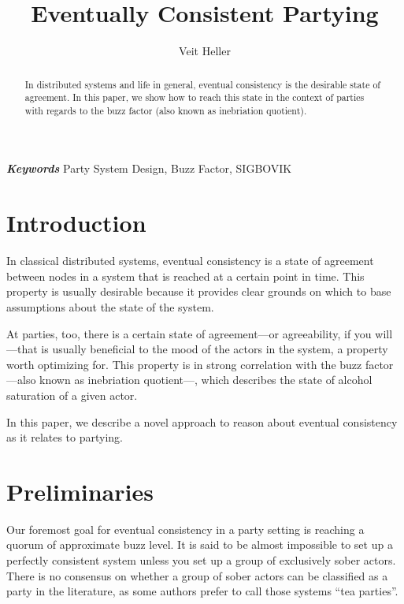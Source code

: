 \documentclass[twocolumn]{article}
\providecommand{\keywords}[1]{\noindent \textbf{\textit{Keywords}} #1}
\begin{document}
\title{Eventually Consistent Partying}
\author{Veit Heller}

\maketitle

\begin{abstract}
In distributed systems and life in general, eventual consistency is the
desirable state of agreement. In this paper, we show how to reach this state in
the context of parties with regards to the buzz factor (also known as
inebriation quotient).
\end{abstract}

\bigskip

\keywords{Party System Design, Buzz Factor, SIGBOVIK}

\section{Introduction}

In classical distributed systems, eventual consistency is a state of agreement
between nodes in a system that is reached at a certain point in time. This
property is usually desirable because it provides clear grounds on which to
base assumptions about the state of the system.

At parties, too, there is a certain state of agreement—or agreeability, if you
will—that is usually beneficial to the mood of the actors in the system, a
property worth optimizing for. This property is in strong correlation with the
buzz factor—also known as inebriation quotient—, which describes the state of
alcohol saturation of a given actor.

In this paper, we describe a novel approach to reason about eventual
consistency as it relates to partying.

\section{Preliminaries}

Our foremost goal for eventual consistency in a party setting is reaching a
quorum of approximate buzz level. It is said to be almost impossible to set up
a perfectly consistent system unless you set up a group of exclusively sober
actors. There is no consensus on whether a group of sober actors can be
classified as a party in the literature, as some authors prefer to call those
systems “tea parties”.
\end{document}
